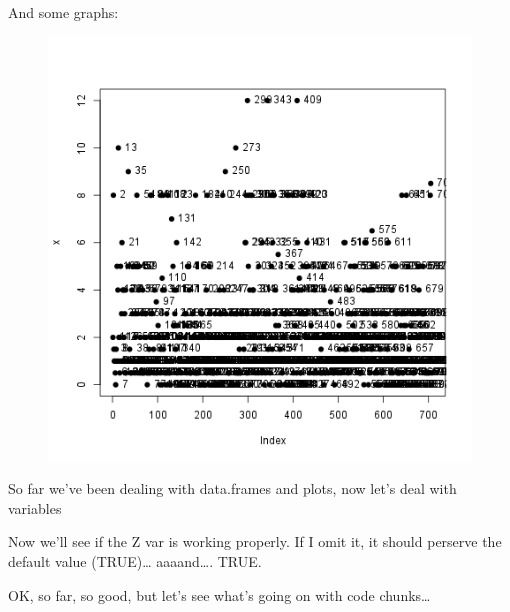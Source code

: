 \documentclass{article}
\makeatletter
\def\maxwidth{\ifdim\Gin@nat@width>\linewidth\linewidth
\else\Gin@nat@width\fi}
\let\Oldincludegraphics\includegraphics
\renewcommand{\includegraphics}[1]{\Oldincludegraphics[width=\maxwidth]{#1}}
\makeatother
\begin{document}
And some graphs:

\begin{figure}[htbp]
\centering
\includegraphics{f1891776819c845a6068c59a90f70d8f.png}
\caption{}
\end{figure}

So far we've been dealing with data.frames and plots, now let's deal
with variables

Now we'll see if the Z var is working properly. If I omit it, it should
perserve the default value (TRUE)\ldots{} aaaand\ldots{}. TRUE.

OK, so far, so good, but let's see what's going on with code
chunks\ldots{}
\end{document}
